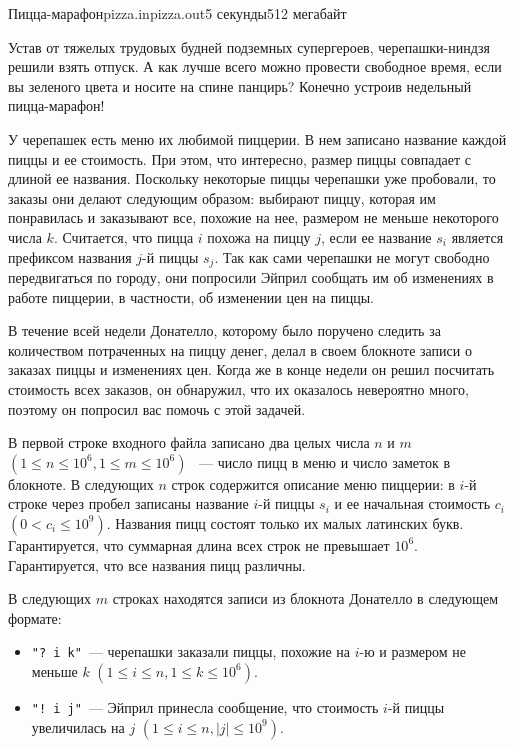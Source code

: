\begin{problem}{Пицца-марафон}{pizza.in}{pizza.out}{5 секунды}{512 мегабайт}


Устав от тяжелых трудовых будней подземных супергероев, черепашки-ниндзя решили взять отпуск.
А как лучше всего можно провести свободное время, если вы зеленого цвета и носите на спине панцирь?
Конечно устроив недельный пицца-марафон!

У черепашек есть меню их любимой пиццерии. В нем записано название каждой пиццы и ее стоимость.
При этом, что интересно, размер пиццы совпадает с длиной ее названия. Поскольку некоторые пиццы 
черепашки уже пробовали, то заказы они делают следующим образом: выбирают пиццу, которая им понравилась
и заказывают все, похожие на нее, размером не меньше некоторого числа $k$. Считается, что пицца $i$ похожа на
пиццу $j$, если ее название $s_i$ является префиксом названия $j$-й пиццы $s_j$. Так как сами черепашки не могут
свободно передвигаться по городу, они попросили Эйприл сообщать им об изменениях в работе пиццерии,
в частности, об изменении цен на пиццы. 

В течение всей недели Донателло, которому было поручено следить за количеством потраченных на пиццу
денег, делал в своем блокноте записи о заказах пиццы и изменениях цен. Когда же в конце недели он решил
посчитать стоимость всех заказов, он обнаружил, что их оказалось невероятно много, поэтому он попросил вас 
помочь с этой задачей.

\InputFile
В первой строке входного файла записано два целых числа $n$ и $m$ $(1 \le n \le 10^6, 1 \le m \le 10^6)$
~--- число пицц в меню и число заметок в блокноте. В следующих $n$ строк содержится описание меню пиццерии:
в $i$-й строке через пробел записаны название $i$-й пиццы $s_i$ и ее начальная стоимость $c_i$ $(0 < c_i \le 10^9)$.
Названия пицц состоят только их малых латинских букв. Гарантируется, что суммарная длина всех строк не превышает $10^6$.
Гарантируется, что все названия пицц различны.

В следующих $m$ строках находятся записи из блокнота Донателло в следующем формате: 
\begin{itemize}
\item \texttt{"? i k"}~--- черепашки заказали пиццы, похожие на $i$-ю и размером не меньше $k$ $(1 \le i \le n, 1 \le k \le 10^6)$.
\item \texttt{"! i j"}~--- Эйприл принесла сообщение, что стоимость $i$-й пиццы увеличилась на $j$ $(1 \le i \le n, |j| \le 10^9)$.
\end{itemize}


\end{problem}
